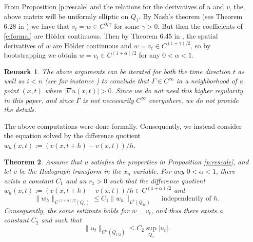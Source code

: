 \documentclass{amsart}
\newtheorem{theorem}{Theorem}[section]
\newtheorem{remark}[theorem]{Remark}
\numberwithin{equation}{section}
\begin{document}
From Proposition \ref{p:rescale} and the relations for the derivatives of $u$ and $v$, the above matrix will be uniformly elliptic on $Q_1$. By Nash's theorem (see Theorem 6.28 in \cite{l96}) we have that $ v_t= w \in C^{0,\gamma}$ for some $\gamma>0$. But then the coefficients of \eqref{e:formal} are H\"older continuous. Then by Theorem 6.45 in \cite{l96}, the spatial derivatives of $w$ are H\"older continuous and $w=v_t \in C^{(1+\gamma)/2}$, so by bootstrapping we obtain $w=v_t \in C^{(1+\alpha)/2}$ for any $0<\alpha<1$. 

\begin{remark}
    The above arguments can be iterated for both the time direction $t$ as well as $i<n$ (see for instance \cite{ks24}) to conclude that $\Gamma \in C^{\infty}$ in a neighborhood of a point $(x,t)$ where $|\nabla u(x,t)|>0$. Since we do not need this higher regularity in this paper, and since $\Gamma$ is not necessarily $C^{\infty}$ everywhere, we do not provide the details.  
\end{remark}

 The above computations were done formally. Consequently, we instead consider the equation solved by the difference quotient $w_h(x,t):= (v(x,t+h)-v(x,t))/h$. 

\begin{theorem} \label{t:hodograph}
 Assume that $u$ satisfies the properties in Proposition \ref{p:rescale}, and let $v$ be the Hodograph transform in the $x_n$ variable. For any $0<\alpha<1$, there exists a constant $C_1$ and an $r_1>0$ such that the difference quotient $w_h(x,t):= (v(x,t+h)-v(x,t))/h \in C^{(1+\alpha)/2}$ and 
 \[
  \| w_h \|_{C^{(1+\alpha)/2}(Q_r)} \leq C_1 \| w_h \|_{L^p(Q_{2r})} \quad \text{ independently of } h. 
 \]
 Consequently, the same estimate holds for $w=v_t$, and thus there exists a constant $C_2$ and
 such that 
 \begin{equation} \label{e:utholder}
  \| u_t \|_{C^{\alpha}(Q_{1/2})} \leq C_2 \sup_{Q_{1}} |u_t|. 
 \end{equation}
\end{theorem}
\end{document}
